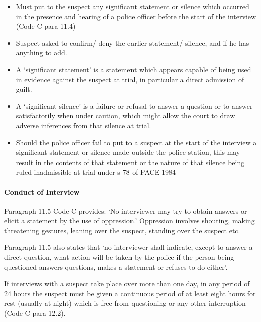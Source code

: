 \documentclass[
]{article}
\providecommand{\tightlist}{%
  \setlength{\itemsep}{0pt}\setlength{\parskip}{0pt}}
\begin{document}
\begin{enumerate}
  \begin{itemize}
  \tightlist
  \item
    Must put to the suspect any significant statement or silence which
    occurred in the presence and hearing of a police officer before the
    start of the interview (Code C para 11.4)
  \item
    Suspect asked to confirm/ deny the earlier statement/ silence, and
    if he has anything to add.
  \item
    A `significant statement' is a statement which appears capable of
    being used in evidence against the suspect at trial, in particular a
    direct admission of guilt.
  \item
    A `significant silence' is a failure or refusal to answer a question
    or to answer satisfactorily when under caution, which might allow
    the court to draw adverse inferences from that silence at trial.
  \item
    Should the police officer fail to put to a suspect at the start of
    the interview a significant statement or silence made outside the
    police station, this may result in the contents of that statement or
    the nature of that silence being ruled inadmissible at trial under s
    78 of PACE 1984
  \end{itemize}
\end{enumerate}

\hypertarget{conduct-of-interview}{%
\paragraph{Conduct of Interview}\label{conduct-of-interview}}

Paragraph 11.5 Code C provides: `No interviewer may try to obtain
answers or elicit a statement by the use of oppression.' Oppression
involves shouting, making threatening gestures, leaning over the
suspect, standing over the suspect etc.

Paragraph 11.5 also states that `no interviewer shall indicate, except
to answer a direct question, what action will be taken by the police if
the person being questioned answers questions, makes a statement or
refuses to do either'.

If interviews with a suspect take place over more than one day, in any
period of 24 hours the suspect must be given a continuous period of at
least eight hours for rest (usually at night) which is free from
questioning or any other interruption (Code C para 12.2).
\end{document}
